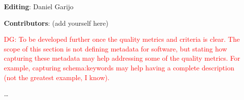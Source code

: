 \textbf{Editing}: Daniel Garijo

\textbf{Contributors}: (add yourself here)

\textcolor{red}{DG: To be developed further once the quality metrics and criteria is clear. The scope of this section is not defining metadata for software, but stating how capturing these metadata may help addressing some of the quality metrics. For example, capturing schema:keywords may help having a complete description (not the greatest example, I know).}

\dots
